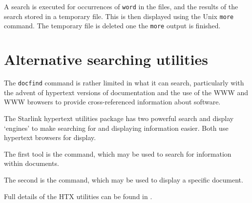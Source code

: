\documentclass[11pt,nolof]{starlink}
\begin{document}
A search is executed for occurrences of {\texttt{word}} in the files, and the
results of the search stored in a temporary file.  This is then displayed
using the Unix {\texttt{more}} command.  The temporary file is deleted one the
{\texttt{more}} output is finished.

\section{\label{alternative_searching_utilities}Alternative searching utilities}

The {\texttt{docfind}} command is rather limited in what it can search,
particularly with the advent of hypertext versions of documentation and
the use of the WWW and WWW browsers to provide cross-referenced
information about software.

The Starlink hypertext utilities package  has two
powerful search and display `engines' to make searching for and
displaying information easier.  Both use hypertext browsers for
display.

The first tool is the 
command, which may be used to search for information within documents.

The second is the 
command, which may be used to display a specific document.

Full details of the HTX utilities can be found in .
\end{document}
